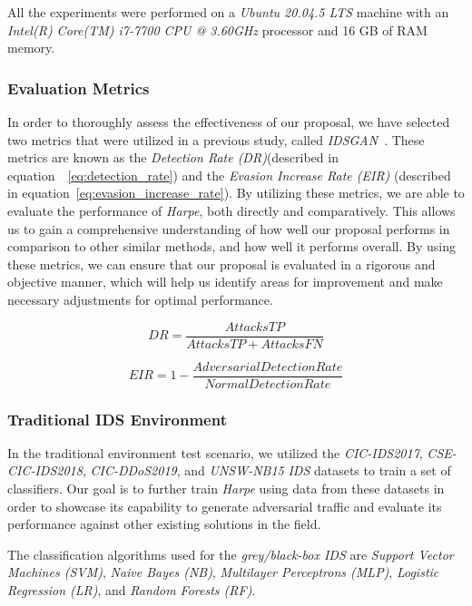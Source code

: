 All the experiments were performed on a \textit{Ubuntu 20.04.5 LTS} machine with an
\textit{Intel(R) Core(TM) i7-7700 CPU @ 3.60GHz} processor and 16 GB of RAM memory.

\subsubsection{Evaluation Metrics}
In order to thoroughly assess the effectiveness of our proposal, we have selected two metrics that were utilized in a
previous study, called \textit{IDSGAN}~\cite{lin2022idsgan}.
These metrics are known as the \textit{Detection Rate (DR)}(described in equation~~\ref{eq:detection_rate}) and the
\textit{Evasion Increase Rate (EIR)} (described in equation~\ref{eq:evasion_increase_rate}).
By utilizing these metrics, we are able to evaluate the performance of \textit{Harpe}, both directly and comparatively.
This allows us to gain a comprehensive understanding of how well our proposal performs in comparison to other similar
methods, and how well it performs overall.
By using these metrics, we can ensure that our proposal is evaluated in a rigorous and objective manner, which will
help us identify areas for improvement and make necessary adjustments for optimal performance.

\begin{equation}
    \label{eq:detection_rate}
    DR = \frac{Attacks TP}{Attacks TP + Attacks FN}
\end{equation}

\begin{equation}
    \label{eq:evasion_increase_rate}
    EIR = 1 - \frac{Adversarial Detection Rate}{Normal Detection Rate}
\end{equation}

\subsubsection{Traditional IDS Environment}
In the traditional environment test scenario, we utilized the \textit{CIC-IDS2017}, \textit{CSE-CIC-IDS2018},
\textit{CIC-DDoS2019}, and \textit{UNSW-NB15} \textit{IDS} datasets to train a set of classifiers.
Our goal is to further train \textit{Harpe} using data from these datasets in order to showcase its capability to
generate adversarial traffic and evaluate its performance against other existing solutions in the field.

The classification algorithms used for the \textit{grey/black-box IDS} are \textit{Support Vector Machines (SVM)},
\textit{Naive Bayes (NB)}, \textit{Multilayer Perceptrons (MLP)}, \textit{Logistic Regression (LR)}, and
\textit{Random Forests (RF)}.

